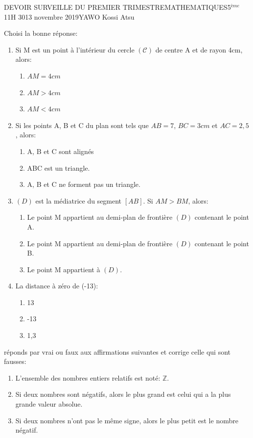 \documentclass[12pt,a4paper]{book}
\newcommand{\prof}{YAWO Kossi Atsu}
\newcommand{\matiere}{MATHEMATIQUES}
\newcommand{\classe}{5$^{ème}$}
\begin{document}
\begin{devoir}{DEVOIR SURVEILLE DU PREMIER TRIMESTRE}{\matiere}{\classe}{1}{1H 30}{13 novembre 2019}{\prof}
\begin{exo}[4]
\begin{defitemize}
\item Choisi la bonne réponse:
\begin{multicols}{2}
\begin{enumerate}
\item Si M est un point à l'intérieur du cercle $\mathcal{(C)}$ de centre A et de rayon 4cm, alors:
\begin{enumerate}
\item $AM=4cm$
\item $AM>4cm$
\item $AM<4cm$
\end{enumerate}
\item Si les points A, B et C du plan sont tels que $AB=7$, $BC=3cm$ et $AC=2,5$, alors:
\begin{enumerate}
\item A, B et C sont alignés
\item ABC est un triangle.
\item A, B et C ne forment pas un triangle.
\end{enumerate}
\item $(D)$ est la médiatrice du segment $[AB]$. Si $AM>BM$, alors:
\begin{enumerate}
\item Le point M appartient au demi-plan de frontière $(D)$ contenant le point A.
\item Le point M appartient au demi-plan de frontière $(D)$ contenant le point B.
\item Le point M appartient à $(D)$.
\end{enumerate}
\item La distance à zéro de (-13):
\begin{enumerate}
\item 13
\item -13
\item 1,3
\end{enumerate}
\end{enumerate}
\end{multicols}
\item réponds par vrai ou faux aux affirmations suivantes et corrige celle qui sont fausses:
\begin{enumerate}
\item L'ensemble des nombres entiers relatifs est noté: $\mathbb{Z}$.
\item Si deux nombres sont négatifs, alors le plus grand est celui qui a la plus grande valeur absolue.
\item Si deux nombres n'ont pas le même signe, alors le plus petit est le nombre négatif.
\end{enumerate}
\end{defitemize}


\end{exo}
\end{devoir}
\end{document}
